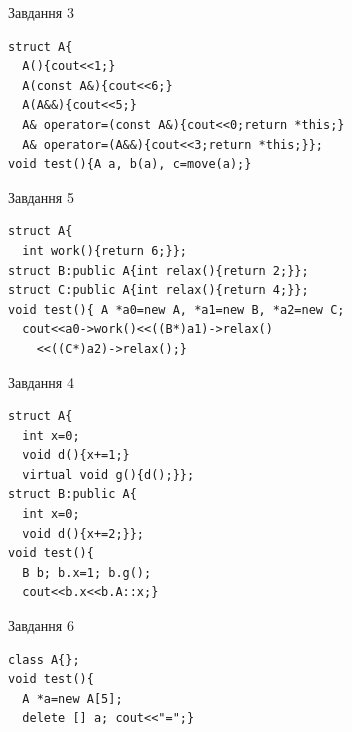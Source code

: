 \documentclass[12pt, ukrainian]{article}
\begin{document}
{{{{{{{{{{\begin{minipage}[t]{11cm}
               
{\begin{center}Завдання {3}\end{center}}
\vspace{-6mm}

\begin{verbatim}
struct A{
  A(){cout<<1;}
  A(const A&){cout<<6;}
  A(A&&){cout<<5;}
  A& operator=(const A&){cout<<0;return *this;}
  A& operator=(A&&){cout<<3;return *this;}};
void test(){A a, b(a), c=move(a);}
\end{verbatim}            


               
{\begin{center}Завдання {5}\end{center}}
\vspace{-6mm}

\begin{verbatim}
struct A{
  int work(){return 6;}};
struct B:public A{int relax(){return 2;}};
struct C:public A{int relax(){return 4;}};
void test(){ A *a0=new A, *a1=new B, *a2=new C;
  cout<<a0->work()<<((B*)a1)->relax()
    <<((C*)a2)->relax();}
\end{verbatim}            


\end{minipage}
\vline \hspace{8mm}
\begin{minipage}[t]{7cm}
               
{\begin{center}Завдання {4}\end{center}}
\vspace{-6mm}

\begin{verbatim}
struct A{
  int x=0;
  void d(){x+=1;}
  virtual void g(){d();}};
struct B:public A{
  int x=0;
  void d(){x+=2;}};
void test(){
  B b; b.x=1; b.g();
  cout<<b.x<<b.A::x;}
\end{verbatim}            


               
{\begin{center}Завдання {6}\end{center}}
\vspace{-6mm}

\begin{verbatim}
class A{};
void test(){
  A *a=new A[5]; 
  delete [] a; cout<<"=";}
\end{verbatim}            



\end{minipage}}}}}}}}}}}
\end{document}
